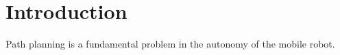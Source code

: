 \section{Introduction}

Path planning is a fundamental problem in the autonomy of the mobile robot.
